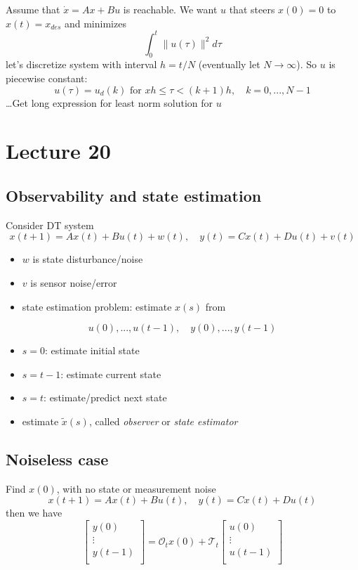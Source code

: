 \documentclass[10pt,letterpaper]{article}
\begin{document}
Assume that $\dot x=Ax+Bu$ is reachable. We want $u$ that steers $x(0)=0$ to $x(t)=x _{des}$ and minimizes
$$
\int ^{t} _{0} \| u(\tau) \| ^{2} d\tau
$$
let's discretize system with interval $h=t/N$ (eventually let $N\rightarrow \infty$). So $u$ is piecewise constant:
$$
u(\tau) = u _{d} (k) \text{ for } xh \le \tau < (k+1)h,\quad k=0,...,N-1
$$
\ldots{}Get long expression for least norm solution for $u$ 
\section{Lecture 20}
\label{sec-19}
\subsection{Observability and state estimation}
\label{sec-19_1}

Consider DT system
$$
x(t+1) = Ax(t) + Bu(t) + w(t), \quad y(t)= Cx(t) +Du(t) + v(t)
$$
\begin{itemize}
\item $w$ is state disturbance/noise
\item $v$ is sensor noise/error
\item state estimation problem: estimate $x(s)$ from
\end{itemize}
$$
u(0),...,u(t-1), \quad y(0), ..., y(t-1)
$$
\begin{itemize}
\item $s=0$: estimate initial state
\item $s=t-1$: estimate current state
\item $s=t$: estimate/predict next state
\item estimate $\tilde x(s)$, called \emph{observer} or \emph{state estimator}
\end{itemize}
\subsection{Noiseless case}
\label{sec-19_2}

Find $x(0)$, with no state or measurement noise
$$
x(t+1) = Ax(t) + Bu(t), \quad y(t)= Cx(t) + Du(t)
$$
then we have
$$
\begin{bmatrix}
  y(0)   \\
  \vdots \\
  y(t-1) \\
\end{bmatrix}
=\mathcal O _{t} x(0) + \mathcal T _{t}
\begin{bmatrix}
  u(0)   \\
  \vdots \\
  u(t-1) \\
\end{bmatrix}
$$
\end{document}
